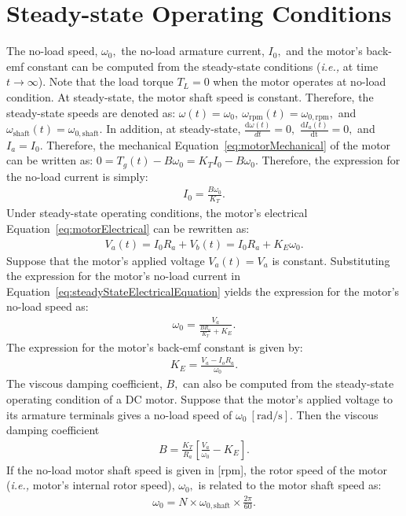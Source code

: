 \section{Steady-state Operating Conditions}
\label{sec:steadyStateOperatingConditions}
The no-load speed, $\omega_0,$ the no-load armature current, $I_0,$ and the motor's back-emf constant can be computed from the steady-state conditions (\textit{i.e.,} at time $t\to\infty$). Note that the load torque $T_L=0$ when the motor operates at no-load condition. At steady-state, the motor shaft speed is constant. Therefore, the steady-state speeds are denoted as: $\omega(t) =  \omega_0,~\omega_{\mathrm{rpm}}(t) =  \omega_{0,\mathrm{rpm}}, $ and $\omega_{\mathrm{shaft}}(t) =  \omega_{0,\mathrm{shaft}}.$  In addition, at steady-state,  $\frac{\mathrm{d}\omega(t)}{dt} = 0,$  $\frac{\mathrm{d}I_a(t)}{\mathrm{dt}} = 0,$ and $I_a = I_0.$  Therefore,  the mechanical Equation~\eqref{eq:motorMechanical} of the motor can be written as: $0 = T_g(t) - B\omega_0 = K_TI_0 - B\omega_0.$ Therefore, the expression for the no-load current is simply: %
%
\begin{align}
  I_0 = \frac{B\omega_0}{K_T}.
  \label{eq:noLoadCurrent}
\end{align}
%
Under steady-state operating conditions, the motor's electrical Equation~\eqref{eq:motorElectrical} can be rewritten as: %
%
\begin{align}
  V_a(t)= I_0R_a + V_b(t) = I_0R_a + K_E\omega_0.
  \label{eq:steadyStateElectricalEquation}
\end{align}
%
Suppose that the motor's applied voltage $V_a(t) = V_a$ is constant. Substituting the expression for the motor's no-load current in Equation~\eqref{eq:steadyStateElectricalEquation} yields the expression for the motor's no-load speed as: %
%
\begin{align}
  \omega_0 = \frac{V_a}{\frac{BR_a}{K_T} + K_E}.
  \label{eq:noLoadSpeed}
\end{align}
%
The expression for the motor's back-emf constant is given by:
\begin{align}
  K_E = \frac{V_a- I_oR_a}{\omega_0}.
  \label{eq:motorBackEmfConstant}
\end{align}
%
The viscous damping coefficient, $B,$ can also be computed from the steady-state operating condition of a DC motor. Suppose that the motor's applied voltage to its armature terminals gives a  no-load speed of $\omega_0~[\si{\radian\per\second}].$ Then the viscous damping coefficient %
%
\begin{align}
  B= \frac{K_T}{R_a}\left[\frac{V_a}{\omega_0} - K_E\right]. 
\end{align}
%
If the no-load motor shaft speed is given in [rpm], the rotor speed of the motor (\textit{i.e.,} motor's internal rotor speed), $\omega_0,$ is related to the motor shaft speed as: %
%
\begin{align}
  \omega_0 = N\times \omega_{0,\mathrm{shaft}}\times \frac{2\pi}{60}.
  \label{eq:speedConversion1}
\end{align}
%


